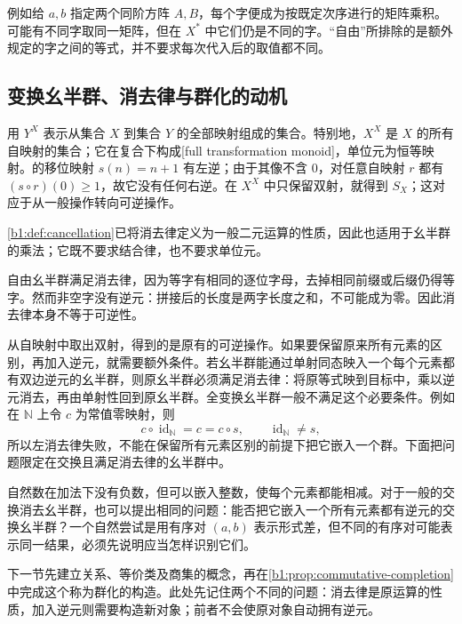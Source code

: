 例如给 \(a,b\) 指定两个同阶方阵 \(A,B\)，每个字便成为按既定次序进行的矩阵乘积。可能有不同字取同一矩阵，但在 \(X^*\) 中它们仍是不同的字。“自由”所排除的是额外规定的字之间的等式，并不要求每次代入后的取值都不同。

\subsection{变换幺半群、消去律与群化的动机}
\label{b1:subsec:0102:03}

用 \(Y^X\) 表示从集合 \(X\) 到集合 \(Y\) 的全部映射组成的集合。特别地，\(X^X\) 是 \(X\) 的所有自映射的集合；它在复合下构成[full transformation monoid]，单位元为恒等映射。的移位映射 \(s(n)=n+1\) 有左逆；由于其像不含 \(0\)，对任意自映射 \(r\) 都有 \((s\circ r)(0)\geq1\)，故它没有任何右逆。在 \(X^X\) 中只保留双射，就得到 \(S_X\)；这对应于从一般操作转向可逆操作。

\cref{b1:def:cancellation}已将消去律定义为一般二元运算的性质，因此也适用于幺半群的乘法；它既不要求结合律，也不要求单位元。

自由幺半群满足消去律，因为等字有相同的逐位字母，去掉相同前缀或后缀仍得等字。然而非空字没有逆元：拼接后的长度是两字长度之和，不可能成为零。因此消去律本身不等于可逆性。

\ProseParagraphBreak
从自映射中取出双射，得到的是原有的可逆操作。如果要保留原来所有元素的区别，再加入逆元，就需要额外条件。若幺半群能通过单射同态映入一个每个元素都有双边逆元的幺半群，则原幺半群必须满足消去律：将原等式映到目标中，乘以逆元消去，再由单射性回到原幺半群。全变换幺半群一般不满足这个必要条件。例如在 \(\mathbb N\) 上令 \(c\) 为常值零映射，则
\[
	c\circ\operatorname{id}_{\mathbb N}=c=c\circ s, \qquad \operatorname{id}_{\mathbb N}\ne s,
\]
所以左消去律失败，不能在保留所有元素区别的前提下把它嵌入一个群。下面把问题限定在交换且满足消去律的幺半群中。

\ProseParagraphBreak
自然数在加法下没有负数，但可以嵌入整数，使每个元素都能相减。对于一般的交换消去幺半群，也可以提出相同的问题：能否把它嵌入一个所有元素都有逆元的交换幺半群？一个自然尝试是用有序对 \((a,b)\) 表示形式差，但不同的有序对可能表示同一结果，必须先说明应当怎样识别它们。

\ProseParagraphBreak
下一节先建立关系、等价类及商集的概念，再在\cref{b1:prop:commutative-completion}中完成这个称为群化的构造。此处先记住两个不同的问题：消去律是原运算的性质，加入逆元则需要构造新对象；前者不会使原对象自动拥有逆元。
